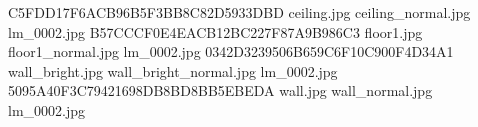 C5FDD17F6ACB96B5F3BB8C82D5933DBD ceiling.jpg ceiling_normal.jpg lm_0002.jpg
B57CCCF0E4EACB12BC227F87A9B986C3 floor1.jpg floor1_normal.jpg lm_0002.jpg
0342D3239506B659C6F10C900F4D34A1 wall_bright.jpg wall_bright_normal.jpg lm_0002.jpg
5095A40F3C79421698DB8BD8BB5EBEDA wall.jpg wall_normal.jpg lm_0002.jpg